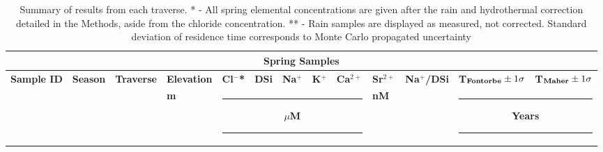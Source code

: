 \begin{landscape}


    {\footnotesize
\begin{longtable}{l l l l l l l l l l l l l}

    \caption{Summary of results from each traverse. * - All spring elemental concentrations are given after the rain and hydrothermal correction detailed in the Methods, aside from the chloride concentration. ** - Rain samples are displayed as measured, not corrected. Standard deviation of residence time corresponds to Monte Carlo propagated uncertainty} 
    \label{tab:results_table} \\

    
    \hline
    \multicolumn{13}{c}{\textbf{Spring Samples}} \\
    \hline
    \textbf{Sample ID}  &  \textbf{Season}  &  \textbf{Traverse}  &  \textbf{Elevation}  &  \textbf{Cl$^-$*}  &  \textbf{DSi}  &  \textbf{Na$^{+}$}  &  \textbf{K$^{+}$}  &  \textbf{Ca$^{2+}$}  &  \textbf{Sr$^{2+}$}  &  \textbf{Na$^{+}$/DSi}  &  \textbf{T$_{\text{\textbf{Fontorbe}}} \pm 1\sigma$ }  &  \textbf{T$_{\text{\textbf{Maher}}} \pm 1\sigma$} \\
    \hline
      &   &   &  \textbf{m}  &  \multicolumn{5}{c}{\hspace{-0.35cm}\rule{2.5cm}{0.8pt} \hspace{0.3cm}\textbf{ $\mu$M } \hspace{0.3cm} \rule{2.5cm}{0.8pt}} & \multicolumn{1}{l}{\textbf{nM}} &  &  \multicolumn{2}{c}{\hspace{-0.35cm}\rule{1.5cm}{0.8pt} \hspace{0.3cm}\textbf{ Years } \hspace{0.3cm} \rule{1.5cm}{0.8pt}} \\
    \hline
    \endfirsthead
    

\end{longtable}}
\end{landscape}
